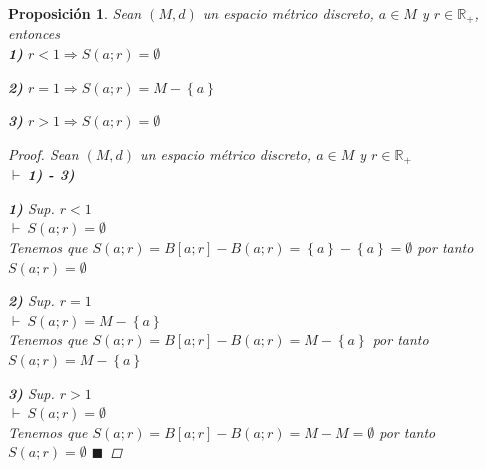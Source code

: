 \documentclass[oneside]{book} %
\theoremstyle{Teorema}
\newtheorem{Proposicion}[Definicion]{Proposición}
\theoremstyle{Ejemplos}
\theoremstyle{[Obs]}
\renewcommand{\{}{\left\lbrace} %
\renewcommand{\}}{\right\rbrace} %
\newcommand{\R}{\mathbb{R}} %
\renewcommand{\qed}{$\blacksquare$} %
\newcommand{\pd}{$\vdash\ $} %
\begin{document}
			\begin{Proposicion}\setlength{\parindent}{0em}
			
				Sean $(M, d)$ un espacio métrico discreto, $a \in M$ y $r \in \R_{+}$, entonces \\ 

				\textbf{1)} $r < 1 \Rightarrow S(a;r) = \emptyset$

				\textbf{2)} $r = 1 \Rightarrow S(a;r) = M - \{ a \}$

				\textbf{3)} $r > 1 \Rightarrow S(a;r) = \emptyset$

				\begin{proof}
					
					Sean $(M, d)$ un espacio métrico discreto, $a \in M$ y $r \in \R_{+}$ \\ 
					\pd \textbf{1) - 3)} 

					\textbf{1)} Sup. $r < 1$ \\ 
					\pd $S(a;r) = \emptyset$ \\ 
					Tenemos que $S(a;r) = B[a;r] - B(a;r) = \{ a  \} - \{ a \} = \emptyset$ por tanto $S(a;r) = \emptyset$ 

					\textbf{2)} Sup. $r = 1$ \\ 
					\pd $S(a;r) = M - \{ a \}$ \\ 
					Tenemos que $S(a;r) = B[a;r] - B(a;r) = M - \{ a \}$ por tanto $S(a;r) = M - \{ a \}$ 

					\textbf{3)} Sup. $r > 1$ \\ 
					\pd $S(a;r) = \emptyset$ \\ 
					Tenemos que $S(a;r) = B[a;r] - B(a;r) = M - M = \emptyset$ por tanto $S(a;r) = \emptyset$ \qed

				\end{proof}
			
			\end{Proposicion}
\end{document}
